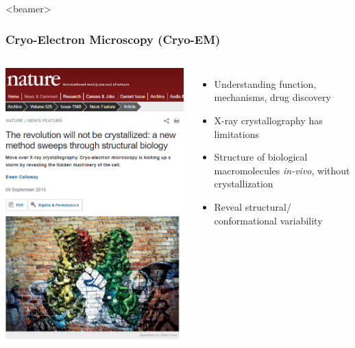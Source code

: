 \documentclass{beamer}
\begin{document}
\begin{frame}<beamer>
\frametitle{Cryo-Electron Microscopy (Cryo-EM)}
\begin{columns}
\centering
\includegraphics[scale=0.35]{figures/nature_news.png}
\begin{itemize}
\item Understanding function, mechanisms, drug discovery
\item X-ray crystallography has limitations
\item Structure of biological macromolecules \textit{in-vivo}, without crystallization
\item Reveal structural/ conformational variability
\end{itemize}
\end{columns}
\end{frame}
\end{document}
